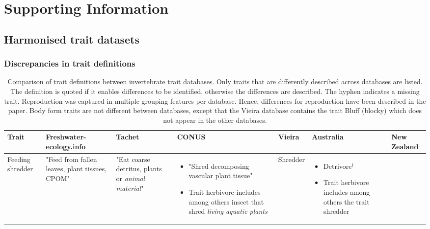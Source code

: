 \documentclass[../Draft_harmonization_paper.tex]{subfiles}
\begin{document}
\section*{Supporting Information}
\label{sec:SI}

\subsection*{Harmonised trait datasets}

\subsubsection*{Discrepancies in trait definitions}

\begin{landscape}
    \begin{longtable}{m{1.8cm}|m{3cm}|m{3cm}|m{3cm}|m{3cm}|m{3.2cm}|m{3cm}}
        \caption{Comparison of trait definitions between invertebrate trait databases. Only traits that are differently described across databases are listed. The definition is quoted if it enables differences to be identified, otherwise the differences are described. The hyphen indicates a missing trait. Reproduction was captured in multiple grouping features per database. Hence, differences for reproduction have been described in the paper. Body form traits are not different between databases, except that the Vieira database contains the trait Bluff (blocky) which does not appear in the other databases.}
        \label{stab:trait_definitions}
        \endfirsthead
        \toprule[.1em]
        Trait & \specialcell{Freshwater- \\ ecology.info} & Tachet & CONUS & Vieira & Australia & New Zealand \\
        \toprule[.1em]
        Feeding shredder & 
        "Feed from fallen leaves, plant tissues, CPOM" & 
        "Eat coarse detritus, plants or \textit{animal material}" & 
        \begin{itemize}
            \item "Shred decomposing vascular plant tissue"
            \item Trait herbivore includes among others insect that shred \textit{living aquatic plants} 
        \end{itemize} & 
        Shredder & 
        \begin{itemize}
            \item Detrivore$^{\dagger}$
            \item Trait herbivore includes among others the trait shredder

\end{itemize}
\end{longtable}
\end{landscape}
\end{document}
